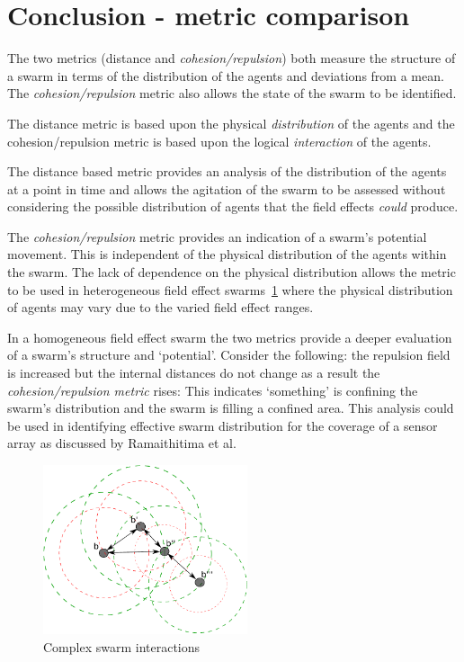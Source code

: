 \documentclass{ieeeaccess}
\begin{document}
\section{Conclusion - metric comparison\label{metric:MagnitudeDistanceComparison}}
The two metrics (distance and \emph{cohesion/repulsion}) both measure the structure of a swarm in terms of the distribution of the agents and deviations from a mean. The \emph{cohesion/repulsion} metric also allows the state of the swarm to be identified.

The distance metric is based upon the physical \emph{distribution} of the agents and the cohesion/repulsion metric is based upon the logical \emph{interaction} of the agents.

The distance based metric provides an analysis of the distribution of the agents at a point in time and allows the agitation of the swarm to be assessed without considering the possible distribution of agents that the field effects \emph{could} produce.

The \emph{cohesion/repulsion} metric provides an indication of a swarm's potential movement. This is independent of the physical distribution of the agents within the swarm. The lack of dependence on the physical distribution allows the metric to be used in heterogeneous field effect swarms~\ref{additional:fieldsWork} where the physical distribution of agents may vary due to the varied field effect ranges. 

In a homogeneous field effect swarm the two metrics provide a deeper evaluation of a swarm's structure and `potential'. Consider the following: the repulsion field is increased but the internal distances do not change as a result the \emph{cohesion/repulsion metric} rises: This indicates `something' is confining the swarm's distribution and the swarm is filling a confined area. This analysis could be used in identifying effective swarm distribution for the coverage of a sensor array as discussed by Ramaithitima et al.~\cite{RWBK:15}

\begin{figure}[H]
\begin{center}
\includegraphics[width=6cm]{figures/FieldEffects2}
\end{center}
\caption{Complex swarm interactions\label{additional:fieldsWork}}
\end{figure}
\end{document}
